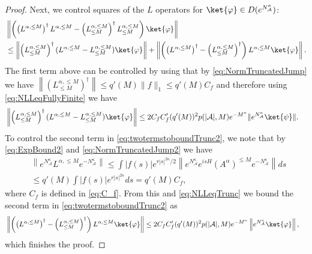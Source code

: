 \documentclass[11pt]{amsart}
\newcommand{\nn}{\nonumber}
\newcommand{\1}{\mathbbm{1}}
\newcommand{\NA}{N_{\mathcal{A}}}
\newcommand{\cA}{\mathcal{A}}
\newcommand{\Ntot}{N_{\operatorname{tot}}}
\newcommand{\bin}[1]{}
\theoremstyle{plain}
\theoremstyle{definition}
\theoremstyle{remark}
\numberwithin{equation}{section}
\begin{document}
\begin{proof}
\bin{Similarly, denoting $L_i^d:=\int f(s)e^{isH}a_i^\dagger e^{-isH}ds$ and $L_{\alpha,i}^d:=\int f(s)e^{isH}(a_{\alpha}^{Dd})_i e^{-isH}ds$, we get
\begin{align}\label{eq:NLLeqd}
\|(\Ntot\!+\!1)(L^d_{i}\!-\!L^d_{\alpha,i})\!\ket{\varphi}\!\|\!\le\! 5C_{2,f}m^{\frac{3}{2}}|\alpha|\|(\Ntot+I)^2\!\ket{\varphi}\!\|.
\end{align}}
Next, we control squares of the $L$ operators for $\ket{\varphi}\in D(e^{\NA^{\kappa}})$:
\begin{align}\label{eq:twotermstoboundTrunc2}
&\nn\left\|\left(\left(L^{\alpha,\le M}\right)^\dagger L^{\alpha,\le M}-\left(L^{\alpha,\le M}_{\le M}\right)^\dagger L^{\alpha,\le M}_{\le M}\right)\ket{\varphi}\right\|\\&\le \left\|\left(L^{\alpha,\le M}_{\le M}\right)^\dagger (L^{\alpha,\le M}-L^{\alpha,\le M}_{\le M})\ket{\varphi}\right\|+\left\|\left(\left(L^{\alpha,\le M}\right)^\dagger-\left(L^{\alpha,\le M}_{\le M}\right)^\dagger\right)L^{\alpha,\le M}\ket{\varphi}\right\|.
\end{align}
The first term above can be controlled by using that by \eqref{eq:NormTruncatedJump} we have $\left\|\left(L_{\le M}^{\alpha,\le M}\right)^\dagger\right\| \le q'(M)\|f\|_1\le q'(M)C_f$ and therefore using \eqref{eq:NLLeqFullyFinite} we have
\begin{align*}&\left\|\left(L^{\alpha,\le M}_{\le M}\right)^\dagger (L^{\alpha,\le M}-L^{\alpha,\le M}_{\le M})\ket{\varphi}\right\| \le 2C_fC'_f (q'(M))^2p(|\cA|,M)e^{-M^{\kappa}}
\|e^{\NA^{\kappa}}\ket{\psi}\|.
\end{align*}
To control the second term in \eqref{eq:twotermstoboundTrunc2}, we note that by \eqref{eq:ExpBound2} and \eqref{eq:NormTruncatedJump2} we have 
\begin{align}
\label{eq:ThereAreLoadsOfInequalitiesHere}
\nn&\left\|e^{\NA^{\kappa}}L^{\alpha,\le M} e^{-\NA^{\kappa}}\right\| \le  \int |f(s)|e^{r|s|^{2\kappa}/2} \left\|e^{\NA^{\kappa}}e^{isH}(A^\alpha)^{\le M}e^{-\NA^{\kappa}}\right\|ds\,\\ &\le q'(M)\int |f(s)| e^{r|s|^{2\kappa}} ds = q'(M)C_f,
\end{align}
where $C_f$ is defined in \eqref{eq:C_f}. From this 
and \eqref{eq:NLLeqTrunc} we bound the second term in \eqref{eq:twotermstoboundTrunc2} as 
\begin{align*}
    &\left\|\left(\left(L^{\alpha,\le M}\right)^\dagger-\left(L^{\alpha,\le M}_{\le M}\right)^\dagger\right)L^{\alpha,\le M}\ket{\varphi}\right\| \le 2 C_fC'_f (q'(M))^2p(|\cA|,M)e^{-M^{\kappa}} \left\|e^{\NA^{\kappa}}\ket{\varphi}\right\|,
\end{align*}
which finishes the proof.
\end{proof}
\end{document}
